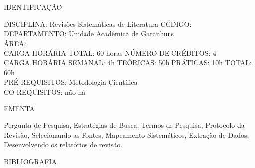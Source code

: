 \documentclass[
	12pt,				%
	openright,			%
  oneside,     %
	a4paper,			%
	english,			%
	french,				%
	spanish,			%
	brazil				%
	]{abntex2}
\begin{document}
\begin{apendicesenv}
\newpage IDENTIFICAÇÃO

DISCIPLINA: Revisões Sistemáticas de Literatura CÓDIGO: \\
DEPARTAMENTO: Unidade Acadêmica de Garanhuns \\
ÁREA: \\
CARGA HORÁRIA TOTAL: 60 horas NÚMERO DE CRÉDITOS: 4\\
CARGA HORÁRIA SEMANAL: 4h TEÓRICAS: 50h PRÁTICAS: 10h TOTAL: 60h\\
PRÉ-REQUISITOS: Metodologia Científica\\
CO-REQUISITOS: não há

EMENTA 

Pergunta de Pesquisa, Estratégias de Busca, Termos de Pesquisa,
Protocolo da Revisão, Selecionando as Fontes, Mapeamento Sistemáticos,
Extração de Dados, Desenvolvendo os relatórios de revisão.

BIBLIOGRAFIA 


\end{apendicesenv}
\end{document}
